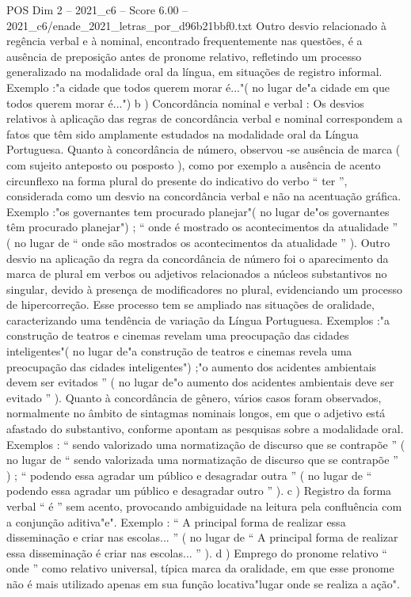 \begin{textsample}{POS Dim 2 – 2021\_c6 – Score 6.00 – 2021\_c6/enade\_2021\_letras\_por\_d96b21bbf0.txt}
Outro desvio relacionado à regência verbal e à nominal, encontrado frequentemente nas questões, é a ausência de preposição antes de pronome relativo, refletindo um processo generalizado na modalidade oral da língua, em situações de registro informal.
Exemplo :"a cidade que todos querem morar é..."( no lugar de"a cidade em que todos querem morar é...") b ) Concordância nominal e verbal : Os desvios relativos à aplicação das regras de concordância verbal e nominal correspondem a fatos que têm sido amplamente estudados na modalidade oral da Língua Portuguesa.
Quanto à concordância de número, observou -se ausência de marca ( com sujeito anteposto ou posposto ), como por exemplo a ausência de acento circunflexo na forma plural do presente do indicativo do verbo “ ter ”, considerada como um desvio na concordância verbal e não na acentuação gráfica.
Exemplo :"os governantes tem procurado planejar"( no lugar de"os governantes têm procurado planejar") ; “ onde é mostrado os acontecimentos da atualidade ” ( no lugar de “ onde são mostrados os acontecimentos da atualidade ” ).
Outro desvio na aplicação da regra da concordância de número foi o aparecimento da marca de plural em verbos ou adjetivos relacionados a núcleos substantivos no singular, devido à presença de modificadores no plural, evidenciando um processo de hipercorreção.
Esse processo tem se ampliado nas situações de oralidade, caracterizando uma tendência de variação da Língua Portuguesa.
Exemplos :"a construção de teatros e cinemas revelam uma preocupação das cidades inteligentes"( no lugar de"a construção de teatros e cinemas revela uma preocupação das cidades inteligentes") ;"o aumento dos acidentes ambientais devem ser evitados ” ( no lugar de"o aumento dos acidentes ambientais deve ser evitado ” ).
Quanto à concordância de gênero, vários casos foram observados, normalmente no âmbito de sintagmas nominais longos, em que o adjetivo está afastado do substantivo, conforme apontam as pesquisas sobre a modalidade oral.
Exemplos : “ sendo valorizado uma normatização de discurso que se contrapõe ” ( no lugar de “ sendo valorizada uma normatização de discurso que se contrapõe ” ) ; “ podendo essa agradar um público e desagradar outra ” ( no lugar de “ podendo essa agradar um público e desagradar outro ” ). c ) Registro da forma verbal “ é ” sem acento, provocando ambiguidade na leitura pela confluência com a conjunção aditiva"e".
Exemplo : “ A principal forma de realizar essa disseminação e criar nas escolas... ” ( no lugar de “ A principal forma de realizar essa disseminação é criar nas escolas... ” ). d ) Emprego do pronome relativo “ onde ” como relativo universal, típica marca da oralidade, em que esse pronome não é mais utilizado apenas em sua função locativa"lugar onde se realiza a ação".

\end{textsample}
